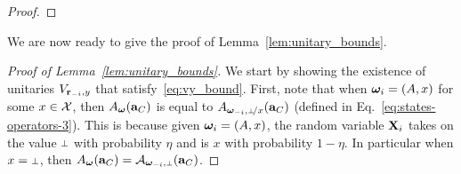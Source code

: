 \begin{proof}
\end{proof}

We are now ready to give the proof of Lemma~\ref{lem:unitary_bounds}.

\begin{proof}[Proof of Lemma~\ref{lem:unitary_bounds}]
We start by showing the existence of unitaries $V_{\mathbf{r}_{-i},y}$ that satisfy~\eqref{eq:vy_bound}. 
First, note that when ${\boldsymbol{\omega}}_i = (A,x)$ for some $x \in \mathcal{X}$, then $A_{\boldsymbol{\omega}}(\mathbf{a}_C)$ is equal to $A_{\bomega_\mi,\dummyx}(\ba_C)$ (defined in Eq.~\eqref{eq:states-operators-3}). This is because given ${\boldsymbol{\omega}}_i = (A,x)$, the random variable $\mathbf{X}_i$ takes on the value $\dummy$ with probability $\eta$ and is $x$ with probability $1 - \eta$. In particular when $x = \dummy$, then $A_\bomega(\ba_C) = \A_{\bomega_\mi,\dummy}(\ba_C)$. 


\end{proof}
